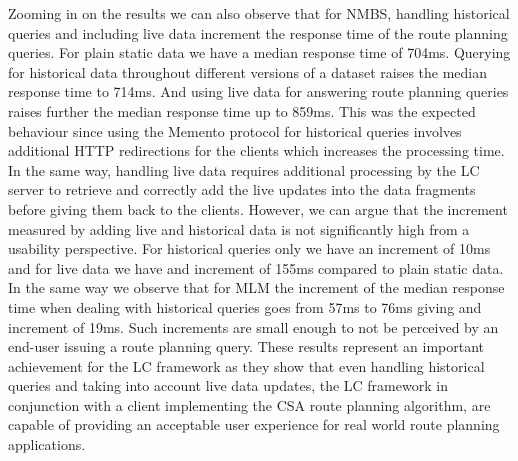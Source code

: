 \documentclass[sw]{iosart2x}
\begin{document}
	Zooming in on the results we can also observe that for NMBS, handling historical queries and including live data increment the response time of the route planning queries. For plain static data we have a median response time of 704ms. Querying for historical data throughout different versions of a dataset raises the median response time to 714ms. And using live data for answering route planning queries raises further the median response time up to 859ms. This was the expected behaviour since using the Memento protocol for historical queries involves additional HTTP redirections for the clients which increases the processing time. In the same way, handling live data requires additional processing by the LC server to retrieve and correctly add the live updates into the data fragments before giving them back to the clients. However, we can argue that the increment measured by adding live and historical data is not significantly high from a usability perspective. For historical queries only we have an increment of 10ms and for live data we have and increment of 155ms compared to plain static data. In the same way we observe that for MLM the increment of the median response time when dealing with historical queries goes from 57ms to 76ms giving and increment of 19ms. Such increments are small enough to not be perceived by an end-user issuing a route planning query. These results represent an important achievement for the LC framework as they show that even handling historical queries and taking into account live data updates, the LC framework in conjunction with a client implementing the CSA route planning algorithm, are capable of providing an acceptable user experience for real world  route planning applications.
	
\end{document}
